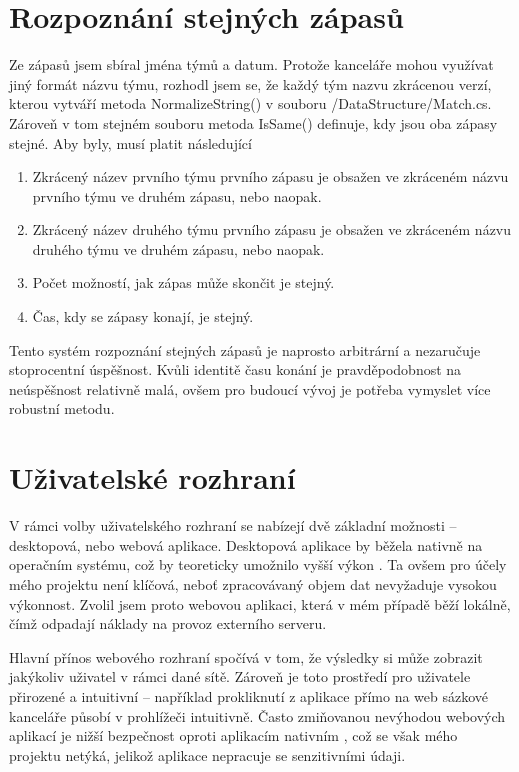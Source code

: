 \documentclass[11pt,a4paper,twoside,openright]{report}
\begin{document}
\section{Rozpoznání stejných zápasů}
Ze zápasů jsem sbíral jména týmů a datum. Protože kanceláře mohou využívat jiný formát názvu týmu, rozhodl jsem se, že každý tým nazvu zkrácenou verzí, kterou vytváří metoda NormalizeString() v souboru /DataStructure/Match.cs.  Zároveň v tom stejném souboru metoda IsSame() definuje, kdy jsou oba zápasy stejné. Aby byly, musí platit následující
\begin{enumerate}
\item Zkrácený název prvního týmu prvního zápasu je obsažen ve zkráceném názvu prvního týmu ve druhém zápasu, nebo naopak.\\
\item Zkrácený název druhého týmu prvního zápasu je obsažen ve zkráceném názvu druhého týmu ve druhém zápasu, nebo naopak.\\
\item Počet možností, jak zápas může skončit je stejný.\\
\item Čas, kdy se zápasy konají, je stejný.\\
\end{enumerate}
Tento systém rozpoznání stejných zápasů je naprosto arbitrární a nezaručuje stoprocentní úspěšnost. Kvůli identitě času konání je pravděpodobnost na neúspěšnost relativně malá, ovšem pro budoucí vývoj je potřeba vymyslet více robustní metodu.

\section{Uživatelské rozhraní}
V rámci volby uživatelského rozhraní se nabízejí dvě základní možnosti – desktopová, nebo webová aplikace. Desktopová aplikace by běžela nativně na operačním systému, což by teoreticky umožnilo vyšší výkon \cite{medium_web_vs_desktop_app}. Ta ovšem pro účely mého projektu není klíčová, neboť zpracovávaný objem dat nevyžaduje vysokou výkonnost. Zvolil jsem proto webovou aplikaci, která v mém případě běží lokálně, čímž odpadají náklady na provoz externího serveru.

Hlavní přínos webového rozhraní spočívá v tom, že výsledky si může zobrazit jakýkoliv uživatel v rámci dané sítě. Zároveň je toto prostředí pro uživatele přirozené a intuitivní – například prokliknutí z aplikace přímo na web sázkové kanceláře působí v prohlížeči intuitivně. Často zmiňovanou nevýhodou webových aplikací je nižší bezpečnost oproti aplikacím nativním \cite{medium_web_vs_desktop_app}, což se však mého projektu netýká, jelikož aplikace nepracuje se senzitivními údaji.
\end{document}
